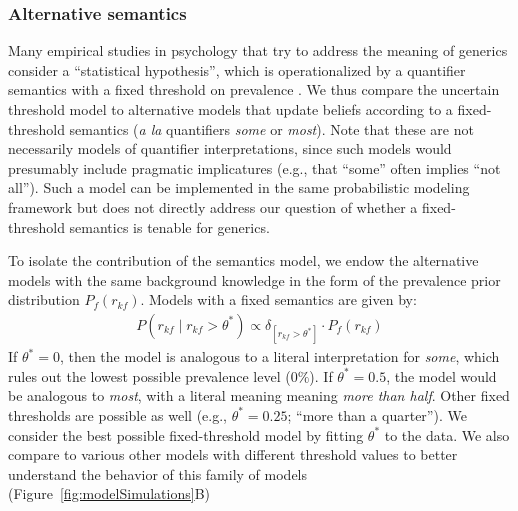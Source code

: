 \documentclass[floatsintext,doc]{apa6}
\newcommand{\ndg}[1]{{\textcolor{Green}{[ndg: #1]}}}
\begin{document}
\subsubsection{Alternative semantics}

Many empirical studies in psychology that try to address the meaning of generics consider a ``statistical hypothesis'', which is operationalized by a quantifier semantics with a fixed threshold on prevalence \cite{Prasada2006, Leslie2008, Cimpian2010, Khemlani2012, Prasada2013, Brandone2014}.
We thus compare the uncertain threshold model to alternative models that update beliefs according to a fixed-threshold semantics (\emph{a la} quantifiers \emph{some} or \emph{most}). 
Note that these are not necessarily models of quantifier interpretations, since such models would presumably include pragmatic implicatures (e.g., that \enquote{some} often implies \enquote{not all}). Such a model can be implemented in the same probabilistic modeling framework \cite{Goodman2013} but does not directly address our question of whether a fixed-threshold semantics is tenable for generics.

To isolate the contribution of the semantics model,  we endow the alternative models with the same background knowledge in the form of the prevalence prior distribution \(P_f(r_{kf})\).
Models with a fixed semantics are given by:
\begin{eqnarray}
P (r_{kf} \mid r_{kf} >  \theta^*) \propto \delta_{[r_{kf} > \theta^*]} \cdot P_f(r_{kf})  \label{eq:L0fixed}
\end{eqnarray}
If $\theta^* = 0$, then the model is analogous to a literal interpretation for \emph{some}, which rules out the lowest possible prevalence level ($0\%$).
If $\theta^* = 0.5$, the model would be analogous to \emph{most}, with a literal meaning meaning \emph{more than half}. 
Other fixed thresholds are possible as well (e.g., $\theta^* = 0.25$; \enquote{more than a quarter}).
We consider the best possible fixed-threshold model by fitting $\theta^*$ to the data.
We also compare to various other models with different threshold values to better understand the behavior of this family of models (Figure~\ref{fig:modelSimulations}B)
\end{document}
